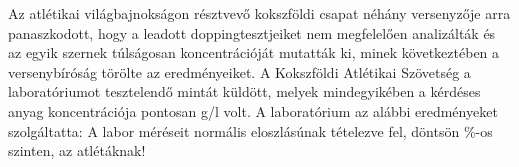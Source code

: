 Az atlétikai világbajnokságon résztvevő kokszföldi csapat néhány 
versenyzője arra panaszkodott, hogy a leadott doppingtesztjeiket 
nem megfelelően analizálták és az egyik szernek túlságosan 
 koncentrációját mutatták ki, minek következtében a versenybíróság 
törölte az eredményeiket. A Kokszföldi Atlétikai Szövetség a 
laboratóriumot tesztelendő  mintát küldött, melyek
mindegyikében a kérdéses anyag koncentrációja pontosan  g/l volt. 
A laboratórium az alábbi eredményeket szolgáltatta:
A labor méréseit normális eloszlásúnak tételezve fel, döntsön \%-os
szinten,  az atlétáknak!